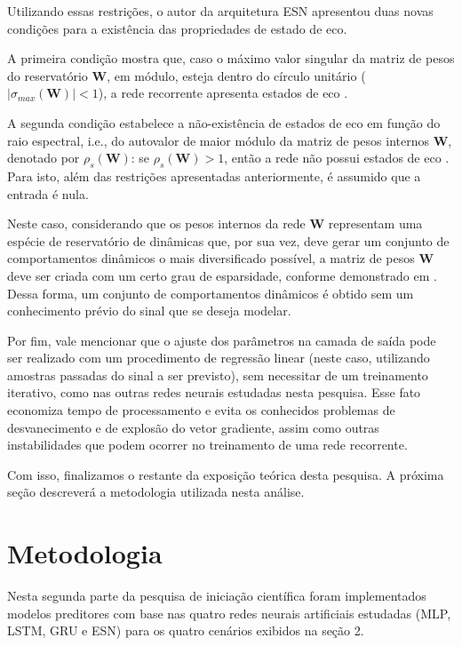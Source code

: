 \documentclass[a4paper, 12pt]{article}
\begin{document}
Utilizando essas restrições, o autor da arquitetura ESN apresentou duas novas condições para a existência das propriedades de estado de eco. 

A primeira condição mostra que, caso o máximo valor singular da matriz
de pesos do reservatório $\mathbf{W}$, em módulo, esteja dentro do círculo unitário ($|\sigma_{max} (\mathbf{W})| < 1$), a rede recorrente apresenta estados de eco \cite{jaeger2001echo, jaeger2002short}.

A segunda condição estabelece a não-existência de estados de eco em função do raio espectral, i.e., do autovalor de maior módulo da matriz de pesos internos $\mathbf{W}$, denotado por $\rho_s (\mathbf{W})$: se $\rho_s (\mathbf{W}) > 1$, então a rede não possui estados de eco \cite{jaeger2001echo}. Para isto, além das restrições apresentadas anteriormente, é assumido que a entrada é nula.

Neste caso, considerando que os pesos internos da rede $\mathbf{W}$ representam uma espécie de reservatório de dinâmicas que, por sua vez, deve gerar um conjunto de comportamentos dinâmicos o mais diversificado possível, a matriz de pesos $\mathbf{W}$ deve ser criada com um certo grau de esparsidade, conforme demonstrado em \cite{jaeger2001echo}. Dessa forma, um conjunto de comportamentos dinâmicos é obtido sem um conhecimento prévio do sinal que se deseja modelar.

Por fim, vale mencionar que o ajuste dos parâmetros na camada de saída pode ser realizado com um procedimento de regressão linear (neste caso, utilizando amostras passadas do sinal a ser previsto), sem necessitar de um treinamento iterativo, como nas outras redes neurais estudadas nesta pesquisa. Esse fato economiza tempo de processamento e evita os conhecidos problemas de desvanecimento e de explosão do vetor gradiente, assim como outras instabilidades que podem ocorrer no treinamento de uma rede recorrente. 

Com isso, finalizamos o restante da exposição teórica desta pesquisa. A próxima seção descreverá  a metodologia utilizada nesta análise.

\section{Metodologia}

Nesta segunda parte da pesquisa de iniciação científica foram implementados modelos preditores com base nas quatro redes neurais artificiais estudadas (MLP, LSTM, GRU e ESN) para os quatro cenários exibidos na seção 2. 
\end{document}
